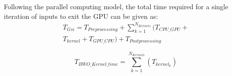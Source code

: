 \documentclass[conference]{IEEEtran}
\theoremstyle{definition}
\begin{document}
Following the parallel computing model, the total time required for a single iteration of inputs to exit the GPU can be given as:
{\scriptsize
    \begin{equation}
    \begin{split}
    T_{Gsi} = T_{Preprocessing} + \sum_{k = 1}^{N_{Kernels}}(T_{CPU\_GPU} + \\ T_{kernel} + T_{GPU\_CPU}) + T_{Postprocessing}
    \end{split}
    \end{equation}
}%

% 
% 



{\scriptsize
\begin{equation}
T_{BWO\_Kernel\_time} = \sum_{k = 1}^{N_{Kernels}}(T_{kernel_k})
\end{equation}
}%

% 
% 
\end{document}
